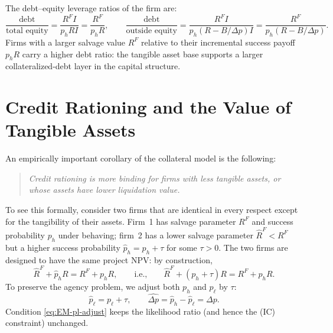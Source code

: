 \documentclass[11pt,a4paper,oneside]{book}
\theoremstyle{plain}
\theoremstyle{definition}
\theoremstyle{remark}
\numberwithin{equation}{chapter}
\begin{document}
The debt--equity leverage ratios of the firm are:
\begin{equation}\label{eq:EM-leverage}
  \frac{\text{debt}}{\text{total equity}} = \frac{R^F I}{p_h R I} = \frac{R^F}{p_h R},
  \qquad
  \frac{\text{debt}}{\text{outside equity}} = \frac{R^F I}{p_h(R - B/\Delta p) I} = \frac{R^F}{p_h(R - B/\Delta p)}.
\end{equation}
Firms with a larger salvage value $R^F$ relative to their incremental success payoff $p_h R$ carry a higher debt ratio: the tangible asset base supports a larger collateralized-debt layer in the capital structure.

\section{Credit Rationing and the Value of Tangible Assets}
\label{sec:EM-tangible}

An empirically important corollary of the collateral model is the following:

\begin{quote}\itshape
Credit rationing is more binding for firms with less tangible assets, or whose assets have lower liquidation value.
\end{quote}

To see this formally, consider two firms that are identical in every respect except for the tangibility of their assets.
Firm~1 has salvage parameter $R^F$ and success probability $p_h$ under behaving; firm~2 has a lower salvage parameter $\widehat{R}^F < R^F$ but a higher success probability $\widehat{p}_h = p_h + \tau$ for some $\tau > 0$.
The two firms are designed to have the same project NPV: by construction,
\begin{equation}\label{eq:EM-NPV-invariant}
  \widehat{R}^F + \widehat{p}_h R = R^F + p_h R,
  \qquad \text{i.e.,} \qquad \widehat{R}^F + (p_h + \tau) R = R^F + p_h R.
\end{equation}
To preserve the agency problem, we adjust both $p_h$ and $p_\ell$ by $\tau$:
\begin{equation}\label{eq:EM-pl-adjust}
  \widehat{p}_\ell = p_\ell + \tau,
  \qquad \widehat{\Delta p} = \widehat{p}_h - \widehat{p}_\ell = \Delta p.
\end{equation}
Condition \eqref{eq:EM-pl-adjust} keeps the likelihood ratio (and hence the (IC) constraint) unchanged.
\end{document}

